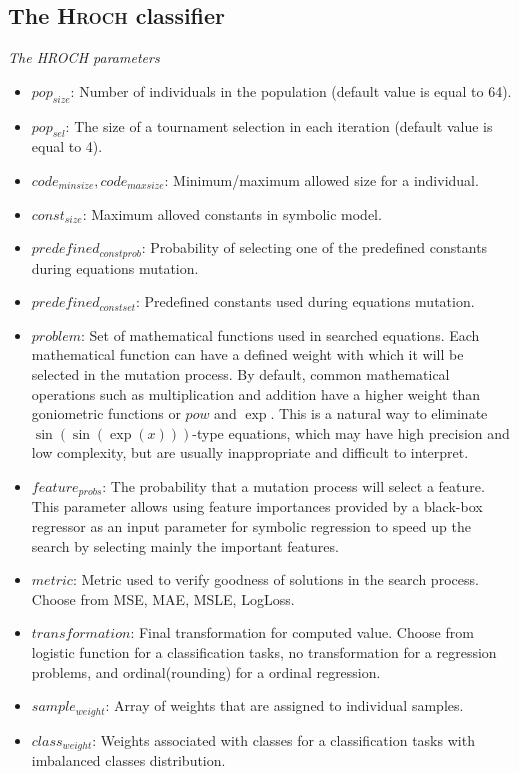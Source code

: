 \documentclass{bmcart}
\begin{document}
 \subsection{The \textsc{Hroch}  classifier}
\textit{ The HROCH parameters}  %
 \begin{itemize}
 	\item $pop_{size}$: Number of individuals in the population (default value is equal to 64).
 	\item $pop_{sel}$: The size of a tournament selection in each iteration (default value is equal to 4).
 	\item $code_{min size}, code_{max size}$: Minimum/maximum allowed size for a individual.
 	\item $const_{size}$: Maximum alloved constants in symbolic model.
 	\item $predefined_{const prob}$: Probability of selecting one of the predefined constants during equations mutation.
 	\item $predefined_{const set}$: Predefined constants used during equations mutation.
 	\item $problem$: Set of mathematical functions used in searched equations. Each mathematical function can have a defined weight with which it will be selected in the mutation process. By default, common mathematical operations such as multiplication and addition have a higher weight than goniometric functions or $pow$ and $\exp$. This is a natural way to eliminate $\sin(\sin(\exp(x)))$-type equations, which may have high precision and low complexity, but are usually inappropriate and difficult to interpret.
 	\item $feature_{probs}$: The probability that a mutation process will select a feature. This parameter allows using feature importances provided by a black-box regressor as an input parameter for symbolic regression to speed up the search by selecting mainly the important features.
 	\item $metric$: Metric used to verify goodness of solutions in the search process. Choose from MSE, MAE, MSLE, LogLoss.
 	\item $transformation$: Final transformation for computed value. Choose from logistic function for a classification tasks, no transformation for a regression problems, and ordinal(rounding) for a ordinal regression.
 	\item $sample_{weight}$: Array of weights that are assigned to individual samples.
 	\item $class_{weight}$: Weights associated with classes for a classification tasks with imbalanced classes distribution.
 \end{itemize}
 
\end{document}

